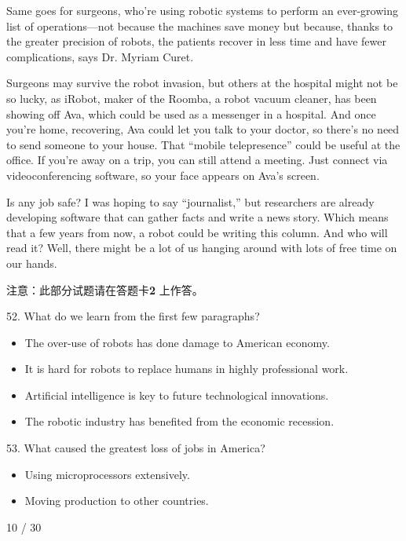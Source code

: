 \documentclass[UTF8,11pt]{ctexart}
\begin{document}
Same goes for surgeons, who’re using robotic systems to perform an ever-growing list of operations—not because the machines save money but because, thanks to the greater precision of robots, the patients recover in less time and have fewer complications, says Dr. Myriam Curet.


Surgeons may survive the robot invasion, but others at the hospital might not be so lucky, as iRobot, maker of the Roomba, a robot vacuum cleaner, has been showing off Ava, which could be used as a messenger in a hospital. And once you’re home, recovering, Ava could let you talk to your doctor, so there’s no need to send someone to your house. That “mobile telepresence” could be useful at the office. If you’re away on a trip, you can still attend a meeting. Just connect via videoconferencing software, so your face appears on Ava’s screen.


Is any job safe? I was hoping to say “journalist,” but researchers are already developing software that can gather facts and write a news story. Which means that a few years from now, a robot could be writing this column. And who will read it? Well, there might be a lot of us hanging around with lots of free time on our hands.


注意：此部分试题请在答题卡\textbf{2} 上作答。


52. What do we learn from the first few paragraphs?


\begin{itemize}[leftmargin=2em,itemsep=.2em,topsep=.4em]\item[A.] The over-use of robots has done damage to American economy.
\item[B.] It is hard for robots to replace humans in highly professional work.
\item[C.] Artificial intelligence is key to future technological innovations.
\item[D.] The robotic industry has benefited from the economic recession.
\end{itemize}

53. What caused the greatest loss of jobs in America?


\begin{itemize}[leftmargin=2em,itemsep=.2em,topsep=.4em]\item[A.] Using microprocessors extensively.
\item[B.] Moving production to other countries.
\end{itemize}

10 / 30
\end{document}
